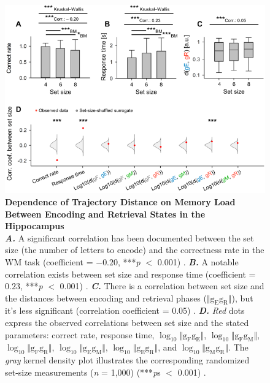 \documentclass[final,3p,times,twocolumn]{elsarticle}
\begin{document}
        \begin{figure}[ht]
        	\centering
            \includegraphics[width=1\textwidth]{./src/figures/.png/Figure_ID_03.png}
        	\caption{\textbf{
Dependence of Trajectory Distance on Memory Load Between Encoding and Retrieval States in the Hippocampus
}
\smallskip
\\
\textbf{\textit{A.}} A significant correlation has been documented between the set size (the number of letters to encode) and the correctness rate in the WM task (coefficient = $-0.20$, ***\textit{p} $<$ 0.001) \cite{van_vugt_hippocampal_2010, li_functional_2023, borders_hippocampus_2022}. \textbf{\textit{B.}} A notable correlation exists between set size and response time (coefficient = $0.23$, ***\textit{p} $<$ 0.001) \cite{dimakopoulos_information_2022}.  \textbf{\textit{C.}} There is a correlation between set size and the distances between encoding and retrieval phases ($\Vert \mathrm{g_{E}g_{R}} \Vert$), but it's less significant (correlation coefficient = 0.05) \cite{li_functional_2023}. \textbf{\textit{D.}} \textit{Red} dots express the observed correlations between set size and the stated parameters: correct rate, response time, $\log_{10}{\Vert \mathrm{g_{F}g_{E}} \Vert}$, $\log_{10}{\Vert \mathrm{g_{F}g_{M}} \Vert}$, $\log_{10}{\Vert \mathrm{g_{F}g_{R}} \Vert}$, $\log_{10}{\Vert \mathrm{g_{E}g_{M}} \Vert}$, $\log_{10}{\Vert \mathrm{g_{E}g_{R}} \Vert}$, and $\log_{10}{\Vert \mathrm{g_{M}g_{R}} \Vert}$. The \textit{gray} kernel density plot illustrates the corresponding randomized set-size measurements (\textit{n} = 1,000) (***\textit{p}s $<$ 0.001) \cite{norimoto_hippocampal_2018, hajos_input-output_2013}.
}
        	\label{fig:03}
        \end{figure}
\end{document}

